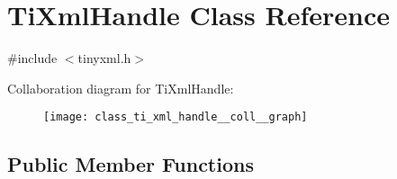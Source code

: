 \hypertarget{class_ti_xml_handle}{\section{\-Ti\-Xml\-Handle \-Class \-Reference}
\label{class_ti_xml_handle}
}


{\ttfamily \#include $<$tinyxml.\-h$>$}



\-Collaboration diagram for \-Ti\-Xml\-Handle\-:
\nopagebreak
\begin{figure}[H]
\begin{center}
\leavevmode
\texttt{[image: class\_ti\_xml\_handle\_\_coll\_\_graph]}
\end{center}
\end{figure}
\subsection*{\-Public \-Member \-Functions}
